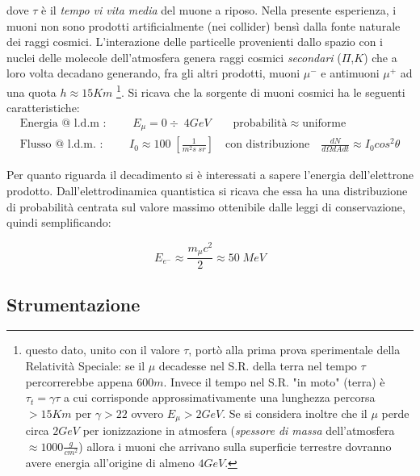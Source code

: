 \documentclass[12pt,a4paper,openright,twoside]{article}
\numberwithin{equation}{section} %
\begin{document}
dove $\tau$ è il \textit{tempo vi vita media} del muone a riposo.
Nella presente esperienza, i muoni non sono prodotti artificialmente (nei collider) bensì dalla fonte naturale dei raggi cosmici. L'interazione delle particelle provenienti dallo spazio con i nuclei delle molecole dell'atmosfera genera raggi cosmici \textit{secondari} ($\Pi$,$K$) che a loro volta decadano generando, fra gli altri prodotti, muoni $\mu^-$ e antimuoni $\mu^+$ ad una quota $h \approx 15 Km$
 \footnote{questo dato, unito con il valore $\tau$, portò alla prima prova sperimentale della Relatività Speciale: se il $\mu$ decadesse nel S.R. della terra nel tempo $\tau$ percorrerebbe appena $600m$. Invece il tempo nel S.R. "in moto" (terra) è $\tau_t = \gamma \tau $ a cui corrisponde approssimativamente una lunghezza percorsa $>15Km$ per $\gamma > 22 $ ovvero $E_{\mu}>2 GeV$.
Se si considera inoltre che il $\mu$ perde circa $2 GeV$ per ionizzazione in atmosfera (\textit{spessore di massa} dell'atmosfera $\approx 1000 \frac{g}{cm^2}$) allora i muoni che arrivano sulla superficie terrestre dovranno avere energia all'origine di almeno $4 GeV$. }.
Si ricava che la sorgente di muoni cosmici ha le seguenti caratteristiche:
\begin{equation}
\begin{gathered}\label{cosmici}
  \text{Energia @ l.d.m : } \qquad E_{\mu} = 0 \div \; 4GeV \qquad \text{probabilità} \approx \text{uniforme} \\ 
 \text{Flusso @ l.d.m. : } \qquad I_0 \approx 100 \; \left[ \frac{1}{m^2 s \; sr} \right] \quad \text{con distribuzione} \quad \frac{dN}{d\Omega dA dt} \approx I_0 cos^2 \theta 
\end{gathered}
\end{equation}

Per quanto riguarda il decadimento si è interessati a sapere l'energia dell'elettrone prodotto.
Dall'elettrodinamica quantistica si ricava che essa ha una distribuzione di probabilità centrata sul valore massimo ottenibile dalle leggi di conservazione, quindi semplificando:

\begin{equation} \label{endecmu}
E_{e^-} \approx \frac{m_{\mu} c^2}{2} \approx 50 \; MeV
\end{equation}


\subsection{Strumentazione} \label{strum}
\end{document}
